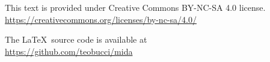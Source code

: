 
This text is provided under Creative Commons BY-NC-SA 4.0 license.\\
\url{https://creativecommons.org/licenses/by-nc-sa/4.0/}

The \LaTeX \ source code is available at\\
\url{https://github.com/teobucci/mida}